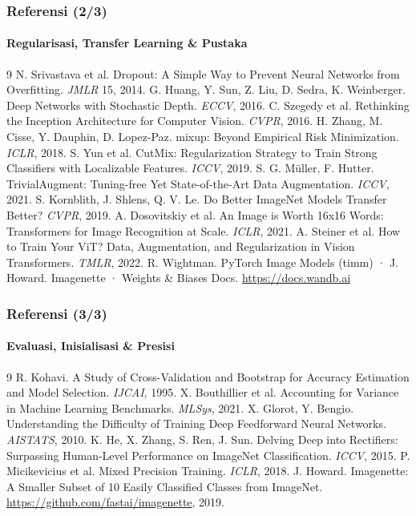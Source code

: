 \documentclass[t,aspectratio=169,xcolor={dvipsnames,table}]{beamer}
\begin{document}
\begin{frame}
    \frametitle{Referensi (2/3)}
    \framesubtitle{Regularisasi, Transfer Learning \& Pustaka}
    \scriptsize
    \begin{thebibliography}{9}
         N. Srivastava et al. Dropout: A Simple Way to Prevent Neural Networks from Overfitting. \textit{JMLR} 15, 2014.
         G. Huang, Y. Sun, Z. Liu, D. Sedra, K. Weinberger. Deep Networks with Stochastic Depth. \textit{ECCV}, 2016.
         C. Szegedy et al. Rethinking the Inception Architecture for Computer Vision. \textit{CVPR}, 2016.
         H. Zhang, M. Cisse, Y. Dauphin, D. Lopez-Paz. mixup: Beyond Empirical Risk Minimization. \textit{ICLR}, 2018.
         S. Yun et al. CutMix: Regularization Strategy to Train Strong Classifiers with Localizable Features. \textit{ICCV}, 2019.
         S. G. Müller, F. Hutter. TrivialAugment: Tuning-free Yet State-of-the-Art Data Augmentation. \textit{ICCV}, 2021.
         S. Kornblith, J. Shlens, Q. V. Le. Do Better ImageNet Models Transfer Better? \textit{CVPR}, 2019.
         A. Dosovitskiy et al. An Image is Worth 16x16 Words: Transformers for Image Recognition at Scale. \textit{ICLR}, 2021.
         A. Steiner et al. How to Train Your ViT? Data, Augmentation, and Regularization in Vision Transformers. \textit{TMLR}, 2022.
         R. Wightman. PyTorch Image Models (timm) · J. Howard. Imagenette · Weights \& Biases Docs. \url{https://docs.wandb.ai}
    \end{thebibliography}
\end{frame}

\begin{frame}
    \frametitle{Referensi (3/3)}
    \framesubtitle{Evaluasi, Inisialisasi \& Presisi}
    \scriptsize
    \begin{thebibliography}{9}
         R. Kohavi. A Study of Cross-Validation and Bootstrap for Accuracy Estimation and Model Selection. \textit{IJCAI}, 1995.
         X. Bouthillier et al. Accounting for Variance in Machine Learning Benchmarks. \textit{MLSys}, 2021.
         X. Glorot, Y. Bengio. Understanding the Difficulty of Training Deep Feedforward Neural Networks. \textit{AISTATS}, 2010.
         K. He, X. Zhang, S. Ren, J. Sun. Delving Deep into Rectifiers: Surpassing Human-Level Performance on ImageNet Classification. \textit{ICCV}, 2015.
         P. Micikevicius et al. Mixed Precision Training. \textit{ICLR}, 2018.
         J. Howard. Imagenette: A Smaller Subset of 10 Easily Classified Classes from ImageNet. \url{https://github.com/fastai/imagenette}, 2019.
    \end{thebibliography}
\end{frame}
\end{document}
